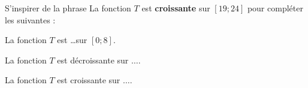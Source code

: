 \documentclass{exos}
\begin{document}
\begin{center}
\end{center}
S'inspirer de la phrase \og La fonction $T$ est \textbf{croissante} sur $[19;24]$ \fg pour compléter les suivantes :
\begin{alphaquestions}
\item La fonction $T$ est \dots sur $[0;8]$.
\item La fonction $T$ est décroissante sur $\dots$.
\item La fonction $T$ est croissante sur $\dots$.
\end{alphaquestions}
\end{document}
